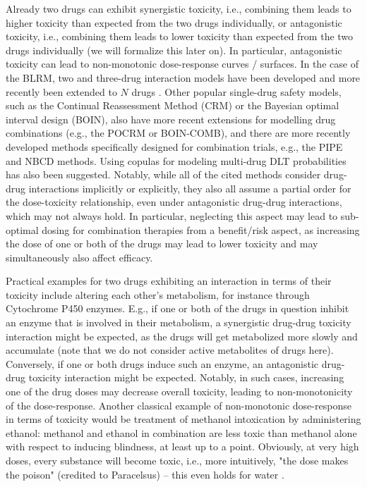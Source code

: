 \documentclass[AMA,STIX1COL]{WileyNJD-v2}
\newcommand{\revision}[1]{#1}
\begin{document}
Already two drugs can exhibit synergistic toxicity, i.e., combining them leads to higher toxicity than expected from the two drugs individually, or antagonistic toxicity, i.e., combining them leads to lower toxicity than expected from the two drugs individually (we will formalize this later on). \revision{In particular, antagonistic toxicity can lead to non-monotonic dose-response curves / surfaces}. In the case of the BLRM, two and three-drug interaction models have been developed \cite{Neuenschwander2014} and more recently been extended to $N$ drugs \cite{OncoBayes2}. Other popular single-drug safety models, such as the Continual Reassessment Method (CRM)\cite{Quigley1990} or the Bayesian optimal interval design (BOIN)\cite{Yuan2016}, also have more recent extensions for modelling drug combinations (e.g., the POCRM\cite{Wages2011} or BOIN-COMB\cite{Zhang2016, Lin2017})\revision{, and there are more recently developed methods specifically designed for combination trials, e.g., the PIPE\cite{Mander2015} and NBCD\cite{Razaee2022} methods. Using copulas for modeling multi-drug DLT probabilities has also been suggested\cite{Yin2009}. Notably, while all of the cited methods consider drug-drug interactions implicitly or explicitly, they also all assume a partial order for the dose-toxicity relationship, even under antagonistic drug-drug interactions, which may not always hold. In particular, neglecting this aspect may lead to sub-optimal dosing for combination therapies from a benefit/risk aspect, as increasing the dose of one or both of the drugs may lead to lower toxicity and may simultaneously also affect efficacy.}

\revision{Practical examples for two drugs exhibiting an interaction in terms of their toxicity include altering each other's metabolism, for instance through Cytochrome P450 enzymes\cite{Tanaka1998}. E.g., if one or both of the drugs in question inhibit an enzyme that is involved in their metabolism, a synergistic drug-drug toxicity interaction might be expected, as the drugs will get metabolized more slowly and accumulate (note that we do not consider active metabolites of drugs here). Conversely, if one or both drugs induce such an enzyme, an antagonistic drug-drug toxicity interaction might be expected. Notably, in such cases, increasing one of the drug doses may decrease overall toxicity, leading to non-monotonicity of the dose-response. Another classical example of non-monotonic dose-response in terms of toxicity would be treatment of methanol intoxication by administering ethanol: methanol and ethanol in combination are less toxic than methanol alone with respect to inducing blindness\cite{Marraffa2012}, at least up to a point. Obviously, at very high doses, every substance will become toxic, i.e., more intuitively, "the dose makes the poison" (credited to Paracelsus\cite{Grandjean2016}) -- this even holds for water \cite{ROWNTREE1923, Gardner2002}.}
\end{document}

